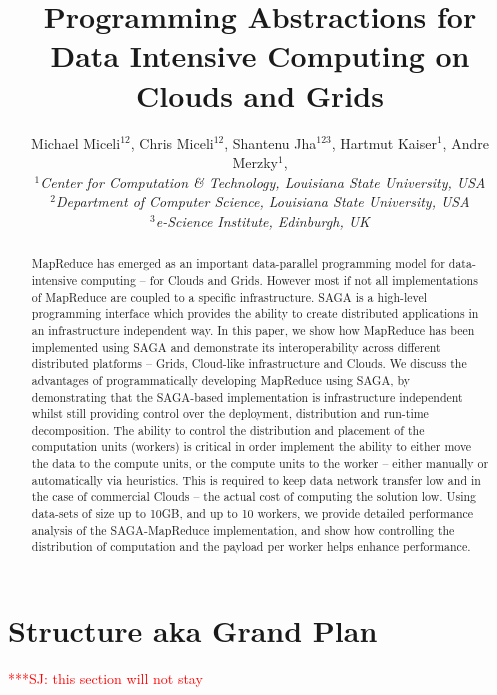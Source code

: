 \documentclass[conference,final]{IEEEtran}
\title{Programming Abstractions for Data Intensive Computing on Clouds and Grids}
\author{Michael Miceli$^{12}$, Chris Miceli$^{12}$, Shantenu
  Jha$^{123}$, Hartmut Kaiser$^{1}$, Andre Merzky$^{1}$, \\
  \small{\emph{$^{1}$Center for Computation \& Technology, Louisiana
      State University, USA}}\\
  \small{\emph{$^{2}$Department of Computer Science, Louisiana State
      University, USA}}\\
  \small{\emph{$^{3}$e-Science Institute, Edinburgh, UK}}\\
}
\newcommand{\jhanote}[1]{ {\textcolor{red} { ***SJ: #1 }}}
\newcommand{\jhanote}[1]{}
\begin{document}
\maketitle

\begin{abstract}
  MapReduce has emerged as an important data-parallel programming
  model for data-intensive computing -- for Clouds and Grids. However
  most if not all implementations of MapReduce are coupled to a
  specific infrastructure.  SAGA is a high-level programming interface
  which provides the ability to create distributed applications in an
  infrastructure independent way. In this paper, we show how MapReduce
  has been implemented using SAGA and demonstrate its interoperability
  across different distributed platforms -- Grids, Cloud-like
  infrastructure and Clouds. We discuss the advantages of
  programmatically developing MapReduce using SAGA, by demonstrating
  that the SAGA-based implementation is infrastructure independent
  whilst still providing control over the deployment, distribution and
  run-time decomposition. The ability to control the distribution and
  placement of the computation units (workers) is critical in order
  implement the ability to either move the data to the compute units,
  or the compute units to the worker -- either manually or
  automatically via heuristics. This is required to
  keep data network transfer low and in the case of commercial Clouds
  -- the actual cost of computing the solution low.  Using data-sets
  of size up to 10GB, and up to 10 workers, we provide detailed
  performance analysis of the SAGA-MapReduce implementation, and show
  how controlling the distribution of computation and the payload per
  worker helps enhance performance.

\end{abstract}


\section*{Structure aka Grand Plan}\jhanote{this section will not
  stay}

\end{document}

